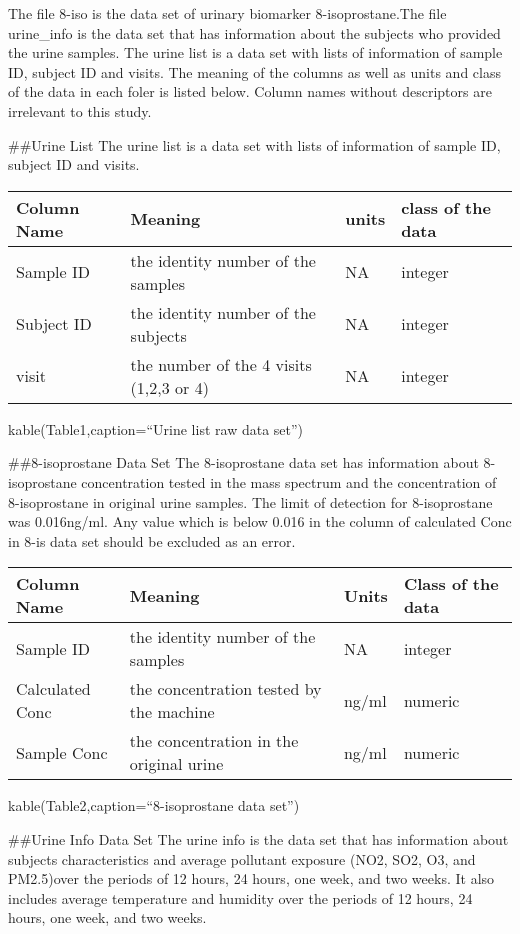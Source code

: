 \documentclass[12pt,]{article}
\begin{document}
The file 8-iso is the data set of urinary biomarker 8-isoprostane.The
file urine\_info is the data set that has information about the subjects
who provided the urine samples. The urine list is a data set with lists
of information of sample ID, subject ID and visits. The meaning of the
columns as well as units and class of the data in each foler is listed
below. Column names without descriptors are irrelevant to this study.

\#\#Urine List The urine list is a data set with lists of information of
sample ID, subject ID and visits.

\begin{longtable}[]{@{}llll@{}}
\toprule
Column Name & Meaning & units & class of the data\tabularnewline
\midrule
\endhead
Sample ID & the identity number of the samples & NA &
integer\tabularnewline
Subject ID & the identity number of the subjects & NA &
integer\tabularnewline
visit & the number of the 4 visits (1,2,3 or 4) & NA &
integer\tabularnewline
\bottomrule
\end{longtable}

kable(Table1,caption=``Urine list raw data set'')

\#\#8-isoprostane Data Set The 8-isoprostane data set has information
about 8-isoprostane concentration tested in the mass spectrum and the
concentration of 8-isoprostane in original urine samples. The limit of
detection for 8-isoprostane was 0.016ng/ml. Any value which is below
0.016 in the column of calculated Conc in 8-is data set should be
excluded as an error.

\begin{longtable}[]{@{}llll@{}}
\toprule
Column Name & Meaning & Units & Class of the data\tabularnewline
\midrule
\endhead
Sample ID & the identity number of the samples & NA &
integer\tabularnewline
Calculated Conc & the concentration tested by the machine & ng/ml &
numeric\tabularnewline
Sample Conc & the concentration in the original urine & ng/ml &
numeric\tabularnewline
\bottomrule
\end{longtable}

kable(Table2,caption=``8-isoprostane data set'')

\#\#Urine Info Data Set The urine info is the data set that has
information about subjects characteristics and average pollutant
exposure (NO2, SO2, O3, and PM2.5)over the periods of 12 hours, 24
hours, one week, and two weeks. It also includes average temperature and
humidity over the periods of 12 hours, 24 hours, one week, and two
weeks.
\end{document}
